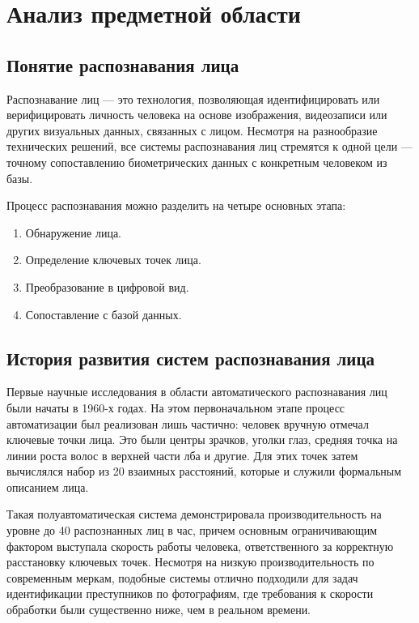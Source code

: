 \section{Анализ предметной области}
\subsection{Понятие распознавания лица}

Распознавание лиц — это технология, позволяющая идентифицировать или верифицировать личность человека на основе изображения, видеозаписи или других визуальных данных, связанных с лицом. Несмотря на разнообразие технических решений, все системы распознавания лиц стремятся к одной цели — точному сопоставлению биометрических данных с конкретным человеком из базы.\cite{sis}

Процесс распознавания можно разделить на четыре основных этапа:

\begin{enumerate}
	\item Обнаружение лица.
	\item Определение ключевых точек лица.
	\item Преобразование в цифровой вид.
	\item Сопоставление с базой данных.
\end{enumerate}

\subsection{История развития систем распознавания лица}

Первые научные исследования в области автоматического распознавания лиц были начаты в 1960-х годах. На этом первоначальном этапе процесс автоматизации был реализован лишь частично: человек вручную отмечал ключевые точки лица. Это были центры зрачков, уголки глаз, средняя точка на линии роста волос в верхней части лба и другие. Для этих точек затем вычислялся набор из 20 взаимных расстояний, которые и служили формальным описанием лица.

Такая полуавтоматическая система демонстрировала производительность на уровне до 40 распознанных лиц в час, причем основным ограничивающим фактором выступала скорость работы человека, ответственного за корректную расстановку ключевых точек. Несмотря на низкую производительность по современным меркам, подобные системы отлично подходили для задач идентификации преступников по фотографиям, где требования к скорости обработки были существенно ниже, чем в реальном времени.


